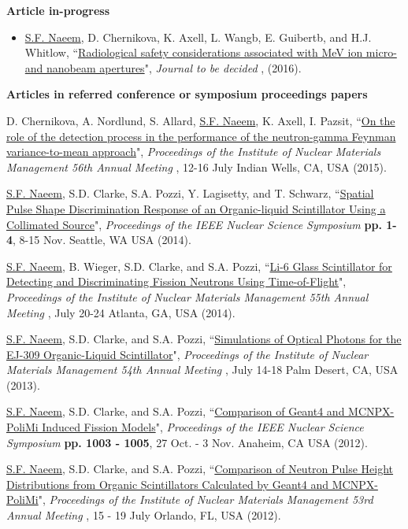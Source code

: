 \documentclass[paper=letter,fontsize=11pt]{scrartcl} %
\newcommand{\PaperEntry}[7]{
		\noindent #1, ``\href{#7}{#2}", \textit{#3} \textbf{#4}, #5 (#6).}
\begin{document}
\textbf{{Article in-progress}}
\begin{itemize}
\item \PaperEntry{\underline{S.F. Naeem}, D. Chernikova, K. Axell, L. Wangb, E. Guibertb, and H.J. Whitlow}{Radiological safety considerations associated with MeV ion micro- and nanobeam apertures}{Journal to be decided}{}{}{2016}{}
\end{itemize}

\textbf{{Articles in referred conference or symposium proceedings papers}}
\begin{etaremune}
\item \PaperEntry{D. Chernikova, A. Nordlund, S. Allard, \underline{S.F. Naeem}, K. Axell, I. Pazsit}{On the role of the detection process in the performance of the neutron-gamma Feynman variance-to-mean approach}{Proceedings of the Institute of Nuclear Materials Management 56th Annual Meeting} {}{12-16 July Indian Wells, CA, USA}{2015}
{}

\item \PaperEntry{\underline{S.F. Naeem}, S.D. Clarke, S.A. Pozzi, Y. Lagisetty, and T. Schwarz}{Spatial Pulse Shape Discrimination Response of an Organic-liquid Scintillator Using a Collimated Source}{Proceedings of the IEEE Nuclear Science Symposium} {pp. 1-4}{8-15 Nov. Seattle, WA USA}{2014}
{http://dx.doi.org/10.1109/NSSMIC.2014.7431168}

\item \PaperEntry{\underline{S.F. Naeem}, B. Wieger, S.D. Clarke, and S.A. Pozzi}{Li-6 Glass Scintillator for Detecting and Discriminating Fission Neutrons Using Time-of-Flight}{Proceedings of the Institute of Nuclear Materials Management 55th Annual Meeting} {}{July 20-24 Atlanta, GA, USA}{2014}
{}

\item \PaperEntry{\underline{S.F. Naeem}, S.D. Clarke, and S.A. Pozzi}{Simulations of Optical Photons for the EJ-309 Organic-Liquid Scintillator}{Proceedings of the Institute of Nuclear Materials Management 54th Annual Meeting} {}{July 14-18 Palm Desert, CA, USA}{2013}
{}

\item \PaperEntry{\underline{S.F. Naeem}, S.D. Clarke, and S.A. Pozzi}{Comparison of Geant4 and MCNPX-PoliMi Induced Fission Models}{Proceedings of the IEEE Nuclear Science Symposium} {pp. 1003 - 1005}{27 Oct. - 3 Nov. Anaheim, CA USA}{2012}
{http://dx.doi.org/10.1109/NSSMIC.2012.6551258}

\item \PaperEntry{\underline{S.F. Naeem}, S.D. Clarke, and S.A. Pozzi}{Comparison of Neutron Pulse Height Distributions from Organic Scintillators Calculated by Geant4 and MCNPX-PoliMi}{Proceedings of the Institute of Nuclear Materials Management 53rd Annual Meeting} {}{15 - 19 July Orlando, FL, USA}{2012}
{}


\end{etaremune}
\end{document}
